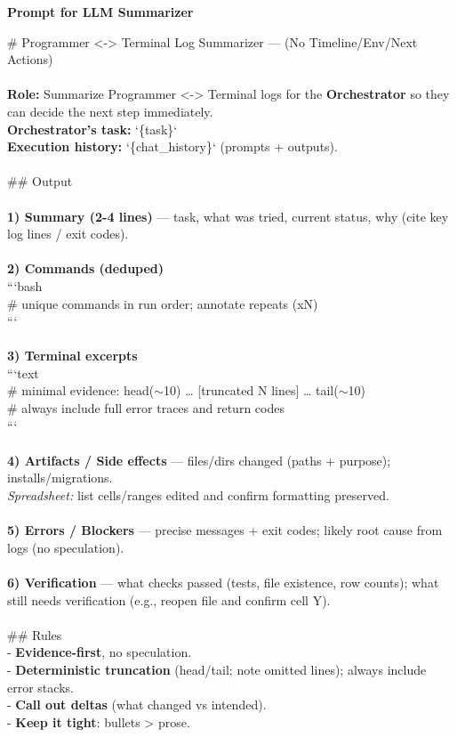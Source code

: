 \documentclass{article} %
\begin{document}
\begin{table}[t]
\begin{tcolorbox} [colback=yellow!10]
{\bf Prompt for LLM Summarizer} 

\tcblower
\# Programmer <-> Terminal Log Summarizer — (No Timeline/Env/Next Actions)\\
\\
\textbf{Role:} Summarize Programmer <-> Terminal logs for the \textbf{Orchestrator} so they can decide the next step immediately.  \\
\textbf{Orchestrator's task:} `\{task\}`\\
\textbf{Execution history:} `\{chat\_history\}` (prompts + outputs).\\
\\
\#\# Output\\
\\
\textbf{1) Summary (2-4 lines)} — task, what was tried, current status, why (cite key log lines / exit codes).\\
\\
\textbf{2) Commands (deduped)}\\
```bash\\
\# unique commands in run order; annotate repeats (xN)\\
```\\
\\
\textbf{3) Terminal excerpts}\\
```text\\
\# minimal evidence: head($\sim$10) … [truncated N lines] … tail($\sim$10)\\
\# always include full error traces and return codes\\
```\\
\\
\textbf{4) Artifacts / Side effects} — files/dirs changed (paths + purpose); installs/migrations.  \\
\textit{Spreadsheet:} list cells/ranges edited and confirm formatting preserved.\\
\\
\textbf{5) Errors / Blockers} — precise messages + exit codes; likely root cause from logs (no speculation).\\
\\
\textbf{6) Verification} — what checks passed (tests, file existence, row counts); what still needs verification (e.g., reopen file and confirm cell Y).\\
\\
\#\# Rules\\
- \textbf{Evidence-first}, no speculation.  \\
- \textbf{Deterministic truncation} (head/tail; note omitted lines); always include error stacks.  \\
- \textbf{Call out deltas} (what changed vs intended).  \\
- \textbf{Keep it tight}: bullets > prose.\\
\end{tcolorbox}
\caption{\label{tab:prompt-llm-summarizer}Prompt for LLM Summarizer.}
\end{table}
\end{document}
